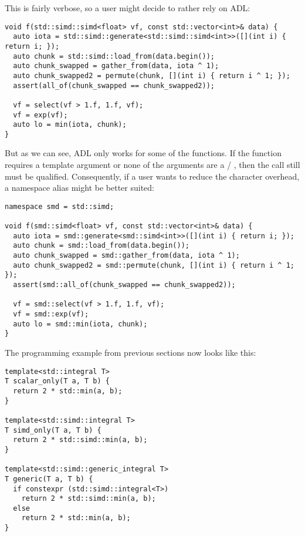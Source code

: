 This is fairly verbose, so a user might decide to rather rely on ADL:
\medskip\begin{lstlisting}[style=Vc]
void f(std::simd::simd<float> vf, const std::vector<int>& data) {
  auto iota = std::simd::generate<std::simd::simd<int>>([](int i) { return i; });
  auto chunk = std::simd::load_from(data.begin());
  auto chunk_swapped = gather_from(data, iota ^ 1);
  auto chunk_swapped2 = permute(chunk, [](int i) { return i ^ 1; });
  assert(all_of(chunk_swapped == chunk_swapped2));

  vf = select(vf > 1.f, 1.f, vf);
  vf = exp(vf);
  auto lo = min(iota, chunk);
}
\end{lstlisting}

But as we can see, ADL only works for some of the functions.
If the function requires a template argument or none of the arguments are a
\simd / \mask, then the call still must be qualified.
Consequently, if a user wants to reduce the character overhead, a namespace
alias might be better suited:
\medskip\begin{lstlisting}[style=Vc]
namespace smd = std::simd;

void f(smd::simd<float> vf, const std::vector<int>& data) {
  auto iota = smd::generate<smd::simd<int>>([](int i) { return i; });
  auto chunk = smd::load_from(data.begin());
  auto chunk_swapped = smd::gather_from(data, iota ^ 1);
  auto chunk_swapped2 = smd::permute(chunk, [](int i) { return i ^ 1; });
  assert(smd::all_of(chunk_swapped == chunk_swapped2));

  vf = smd::select(vf > 1.f, 1.f, vf);
  vf = smd::exp(vf);
  auto lo = smd::min(iota, chunk);
}
\end{lstlisting}

The \simdgeneric programming example from previous sections now looks like
this:
\medskip\begin{lstlisting}[style=Vc]
template<std::integral T>
T scalar_only(T a, T b) {
  return 2 * std::min(a, b);
}

template<std::simd::integral T>
T simd_only(T a, T b) {
  return 2 * std::simd::min(a, b);
}

template<std::simd::generic_integral T>
T generic(T a, T b) {
  if constexpr (std::simd::integral<T>)
    return 2 * std::simd::min(a, b);
  else
    return 2 * std::min(a, b);
}
\end{lstlisting}

